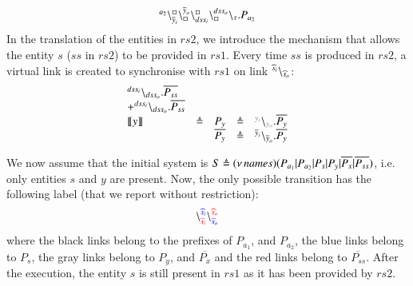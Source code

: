 \begin{example}
\[
\begin{array}{lcl}
\startchain{a_2}\chainedlink{\overline{y}_i}{\noact}\chainedlink{\noact}{\overline{y}_o}    
\chainedlink{dss_i}{\noact}\chainedlink{\noact}{dss_o}\chainend{\silent}.P_{a_2}\\
%
\end{array}
\]
\noindent
In the translation of the entities in  $rs2$, we introduce the mechanism that allows the entity
$s$ ($ss$ in $rs2$) to be provided in $rs1$. Every time $ss$ is produced in $rs2$,  a virtual link is
created to synchronise with $rs1$   on link ${}^{\widehat{s}_i} \backslash_{\widehat{s}_o}$:
\[
\begin{array}{lclcl}
\startchain{dss_i}   \chainend{dss_o}.\overline{P_{ss}} \\


+
\startchain{dss_i}\chainend{dss_o}.\overline{P_{ss}}\\
\llbracket y\rrbracket&\defeq & P_{y}&\defeq &\startchain{{\color{gray}y_i}}\chainend{{\color{gray}y_o}}.\overline{P_{y}} \\
&&\overline{P_{y}}&\defeq &
\startchain{\overline{y}_i}\chainend{\overline{y}_o}.\overline{P_{y}}
\end{array}
\]

\end{example}

\noindent
We now assume that the initial system is $S \triangleq (\nu\, names)(P_{a_1}|P_{a_2}|P_s|P_y|\overline{P_x}|\overline{P_{ss}})$, i.e.
only entities $s$ and $y$ are present. Now, the only possible transition has  the following label (that we report without restriction):
\[
\backslash_{{\color{red}\widehat{s}_i}}^{{\color{blue}\widehat{s}_i}}
\backslash_{{\color{blue}\widehat{s}_o}}^{{\color{red}\widehat{s}_o}}
\]
where the black links belong to the prefixes of $P_{a_1}$, and $P_{a_2}$, the blue links belong to $P_s$, the gray links belong to $P_y$, and $\overline{P_x}$ and the red links belong to $\overline{P_{ss}}$.
After the execution, the entity $s$ is still present in $rs1$ as it has been provided by $rs2$.\\

